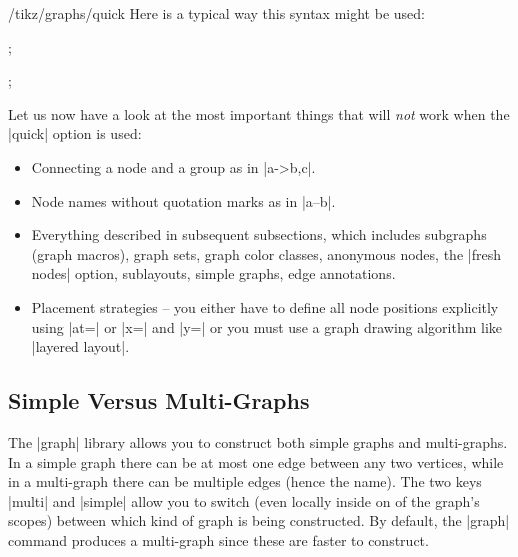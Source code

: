 \begin{key}{/tikz/graphs/quick}
    Here is a typical way this syntax might be used:
\begin{codeexample}[]
\tikz {};
\end{codeexample}

\begin{codeexample}[]
\tikz {};
\end{codeexample}

    Let us now have a look at the most important things that will \emph{not}
    work when the |quick| option is used:

    \begin{itemize}
        \item Connecting a node and a group as in |a->{b,c}|.
        \item Node names without quotation marks as in |a--b|.
        \item Everything described in subsequent subsections, which includes
            subgraphs (graph macros), graph sets, graph color classes,
            anonymous nodes, the |fresh nodes| option, sublayouts, simple
            graphs, edge annotations.
        \item Placement strategies -- you either have to define all node
            positions explicitly using |at=| or |x=| and |y=| or you must use a
            graph drawing algorithm like |layered layout|.
    \end{itemize}
\end{key}


\subsection{Simple Versus Multi-Graphs}
\label{section-library-graphs-simple}

The |graph| library allows you to construct both simple graphs and
multi-graphs. In a simple graph there can be at most one edge between any two
vertices, while in a multi-graph there can be multiple edges (hence the name).
The two keys |multi| and |simple| allow you to switch (even locally inside on
of the graph's scopes) between which kind of graph is being constructed. By
default, the |graph| command produces a multi-graph since these are faster to
construct.

